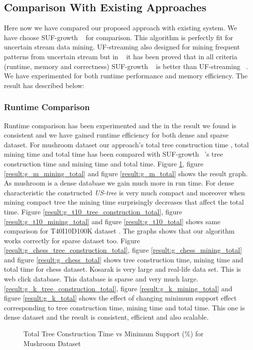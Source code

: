 \subsection{Comparison With Existing Approaches}
Here now we have compared our proposed approach with existing system. We have choose SUF-growth ~\cite{suf_growth}  for comparison. This algorithm is perfectly fit for uncertain stream data mining. UF-streaming also designed for mining frequent patterns from uncertain stream but in ~\cite{suf_growth} it has been proved that in all criteria (runtime, memory and correctness) SUF-growth ~\cite{suf_growth} is better than UF-streaming ~\cite{suf_growth}. We have experimented for both runtime performance and memory efficiency. The result has described below:
    \subsubsection{Runtime Comparison}
    Runtime comparison has been experimented and the in the result we found is consistent and we have gained runtime efficiency for both dense and sparse dataset. For mushroom dataset our approach's total tree construction time , total mining time and total time has been compared with SUF-growth ~\cite{suf_growth}'s tree construction time and mining time and total time. Figure \ref{result:g_m_tree_construction_total}, figure \ref{result:g_m_mining_total} and figure \ref{result:g_m_total} shows the result graph. As mushroom is a dense database we gain much more in run time. For dense characteristic the constructed \emph{US-tree} is very much compact and moreover when mining compact tree the mining time surprisingly decreases that affect the total time. Figure \ref{result:g_t10_tree_construction_total}, figure \ref{result:g_t10_mining_total} and figure \ref{result:g_t10_total} shows same comparison for T40I10D100K dataset . The graphs shows that our algorithm works correctly for sparse dataset too. Figure \ref{result:g_chess_tree_construction_total}, figure \ref{result:g_chess_mining_total} and figure \ref{result:g_chess_total} shows tree construction time, mining time and total time for chess dataset. Kosarak is very large and real-life data set. This is web click database. This database is sparse and very much large. \ref{result:g_k_tree_construction_total}, figure \ref{result:g_k_mining_total} and figure \ref{result:g_k_total} shows the effect of changing minimum support effect corresponding to tree construction time, mining time and total time. This one is dense dataset and the result is consistent, efficient and also scalable.
            \begin{figure}[h]
            \centering
                
            \caption{Total Tree Construction Time vs Minimum Support (\%) for Mushroom Dataset }
            \label{result:g_m_tree_construction_total}
            \end{figure}
            
